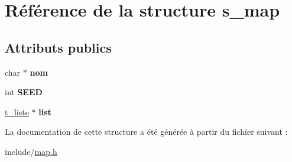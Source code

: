 \hypertarget{structs__map}{}\section{Référence de la structure s\+\_\+map}
\label{structs__map}
\subsection*{Attributs publics}
\begin{DoxyCompactItemize}
\item 
\mbox{\label{structs__map_a6e477491ca38a20e97858e4bfc15bb76}} 
char $\ast$ {\bfseries nom}
\item 
\mbox{\label{structs__map_ac4f52200210d1e78a779bd17505aa821}} 
int {\bfseries S\+E\+ED}
\item 
\mbox{\label{structs__map_a0014bbd4846d6ef5babe9e3980a5cda4}} 
\hyperlink{structt__liste}{t\+\_\+liste} $\ast$ {\bfseries list}
\end{DoxyCompactItemize}


La documentation de cette structure a été générée à partir du fichier suivant \+:\begin{DoxyCompactItemize}
\item 
include/\hyperlink{map_8h}{map.\+h}\end{DoxyCompactItemize}
